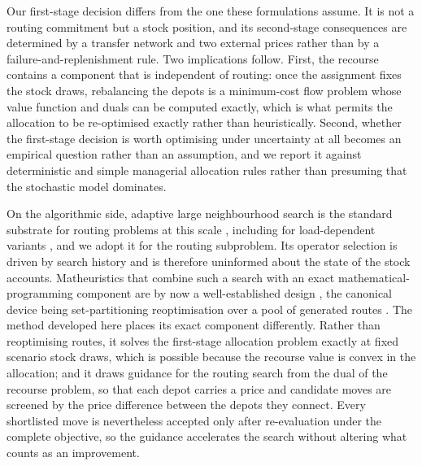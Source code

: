 \documentclass[authoryear,final,3p,times]{elsarticle}
\theoremstyle{definition}
\theoremstyle{plain}
\begin{document}
Our first-stage decision differs from the one these formulations assume. It is
not a routing commitment but a stock position, and its second-stage
consequences are determined by a transfer network and two external prices
rather than by a failure-and-replenishment rule. Two implications follow.
First, the recourse contains a component that is independent of routing: once
the assignment fixes the stock draws, rebalancing the depots is a minimum-cost
flow problem whose value function and duals can be computed exactly, which is
what permits the allocation to be re-optimised exactly rather than
heuristically. Second, whether the first-stage decision is worth optimising
under uncertainty at all becomes an empirical question rather than an
assumption, and we report it against deterministic and simple managerial
allocation rules rather than presuming that the stochastic model dominates.

On the algorithmic side, adaptive large neighbourhood search is the standard
substrate for routing problems at this scale
\citep{ropke2006adaptive,pisinger2007general}, including for load-dependent
variants \citep{demir2012alns}, and we adopt it for the routing subproblem. Its
operator selection is driven by search history and is therefore uninformed
about the state of the stock accounts. Matheuristics that combine such a
search with an exact mathematical-programming component are by now a
well-established design \citep{archetti2014survey}, the canonical device
being set-partitioning reoptimisation over a pool of generated routes
\citep{subramanian2013hybrid}. The method developed here places its exact
component differently. Rather than reoptimising routes, it solves the
first-stage allocation problem exactly at fixed scenario stock draws, which is
possible because the recourse value is convex in the allocation; and it draws
guidance for the routing search from the dual of the recourse problem, so
that each depot carries a price and candidate moves are screened by the price
difference between the depots they connect. Every shortlisted move is
nevertheless accepted only after re-evaluation under the complete objective,
so the guidance accelerates the search without altering what counts as an
improvement.
\end{document}
